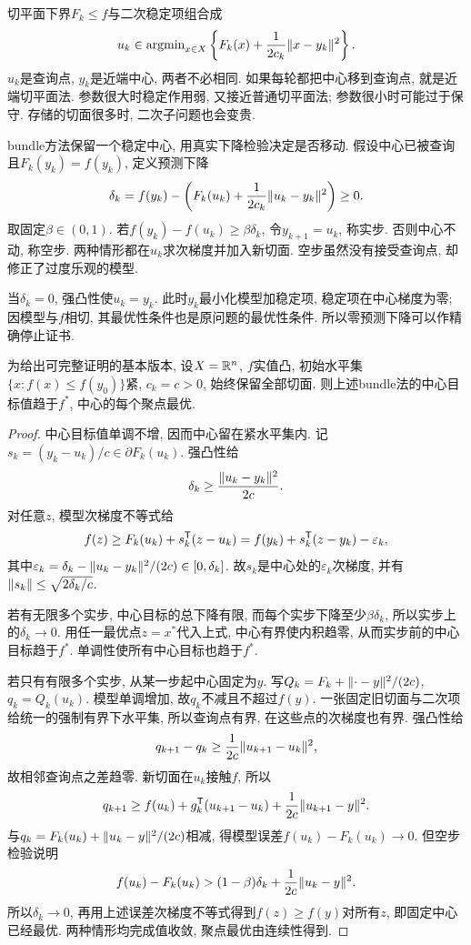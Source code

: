 切平面下界$F_k\le f$与二次稳定项组合成
\[
 u_k\in\operatorname{argmin}_{x\in X}\left\{F_k(x)+\frac1{2c_k}\lVert x-y_k\rVert^2\right\}.
\]
$u_k$是查询点, $y_k$是近端中心, 两者不必相同. 如果每轮都把中心移到查询点, 就是近端切平面法. 参数很大时稳定作用弱, 又接近普通切平面法; 参数很小时可能过于保守. 存储的切面很多时, 二次子问题也会变贵.

bundle方法保留一个稳定中心, 用真实下降检验决定是否移动. 假设中心已被查询且$F_k(y_k)=f(y_k)$, 定义预测下降
\begin{equation}\label{eq:bundle-prediction}
 \delta_k=f(y_k)-\left(F_k(u_k)+\frac1{2c_k}\lVert u_k-y_k\rVert^2\right)\ge0.
\end{equation}
取固定$\beta\in(0,1)$. 若$f(y_k)-f(u_k)\ge\beta\delta_k$, 令$y_{k+1}=u_k$, 称实步. 否则中心不动, 称空步. 两种情形都在$u_k$求次梯度并加入新切面. 空步虽然没有接受查询点, 却修正了过度乐观的模型.

当$\delta_k=0$, 强凸性使$u_k=y_k$. 此时$y_k$最小化模型加稳定项, 稳定项在中心梯度为零; 因模型与$f$相切, 其最优性条件也是原问题的最优性条件. 所以零预测下降可以作精确停止证书.

\begin{theorem}\label{thm:basic-bundle-convergence}
为给出可完整证明的基本版本, 设$X=\mathbb R^n$, $f$实值凸, 初始水平集$\{x:f(x)\le f(y_0)\}$紧, $c_k=c>0$, 始终保留全部切面. 则上述bundle法的中心目标值趋于$f^*$, 中心的每个聚点最优.
\end{theorem}
\begin{proof}
中心目标值单调不增, 因而中心留在紧水平集内. 记$s_k=(y_k-u_k)/c\in\partial F_k(u_k)$. 强凸性给
\[\delta_k\ge\frac{\lVert u_k-y_k\rVert^2}{2c}.\]
对任意$z$, 模型次梯度不等式给
\[
 f(z)\ge F_k(u_k)+s_k^{\mathsf T}(z-u_k)
 =f(y_k)+s_k^{\mathsf T}(z-y_k)-\varepsilon_k,
\]
其中$\varepsilon_k=\delta_k-\lVert u_k-y_k\rVert^2/(2c)\in[0,\delta_k]$. 故$s_k$是中心处的$\varepsilon_k$次梯度, 并有$\lVert s_k\rVert\le\sqrt{2\delta_k/c}$.

若有无限多个实步, 中心目标的总下降有限, 而每个实步下降至少$\beta\delta_k$, 所以实步上的$\delta_k\to0$. 用任一最优点$z=x^*$代入上式, 中心有界使内积趋零, 从而实步前的中心目标趋于$f^*$. 单调性使所有中心目标也趋于$f^*$.

若只有有限多个实步, 从某一步起中心固定为$y$. 写$Q_k=F_k+\lVert \cdot-y\rVert^2/(2c)$, $q_k=Q_k(u_k)$. 模型单调增加, 故$q_k$不减且不超过$f(y)$. 一张固定旧切面与二次项给统一的强制有界下水平集, 所以查询点有界, 在这些点的次梯度也有界. 强凸性给
\[
 q_{k+1}-q_k\ge\frac1{2c}\lVert u_{k+1}-u_k\rVert^2,
\]
故相邻查询点之差趋零. 新切面在$u_k$接触$f$, 所以
\[
 q_{k+1}\ge f(u_k)+g_k^{\mathsf T}(u_{k+1}-u_k)+\frac1{2c}\lVert u_{k+1}-y\rVert^2.
\]
与$q_k=F_k(u_k)+\lVert u_k-y\rVert^2/(2c)$相减, 得模型误差$f(u_k)-F_k(u_k)\to0$. 但空步检验说明
\[
 f(u_k)-F_k(u_k)>(1-\beta)\delta_k+\frac1{2c}\lVert u_k-y\rVert^2.
\]
所以$\delta_k\to0$, 再用上述误差次梯度不等式得到$f(z)\ge f(y)$对所有$z$, 即固定中心已经最优. 两种情形均完成值收敛, 聚点最优由连续性得到.
\end{proof}

